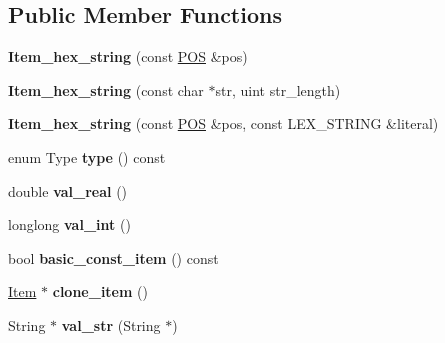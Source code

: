 \subsection*{Public Member Functions}
\begin{DoxyCompactItemize}
\item 
\mbox{\label{classItem__hex__string_af443d112b38e29a35c92ca0e08a1289e}} 
{\bfseries Item\+\_\+hex\+\_\+string} (const \mbox{\hyperlink{structYYLTYPE}{P\+OS}} \&pos)
\item 
\mbox{\label{classItem__hex__string_a8c94371247538d181d7173c548a10da3}} 
{\bfseries Item\+\_\+hex\+\_\+string} (const char $\ast$str, uint str\+\_\+length)
\item 
\mbox{\label{classItem__hex__string_acc4af30a5014f03d0ea41818083e08e0}} 
{\bfseries Item\+\_\+hex\+\_\+string} (const \mbox{\hyperlink{structYYLTYPE}{P\+OS}} \&pos, const L\+E\+X\+\_\+\+S\+T\+R\+I\+NG \&literal)
\item 
\mbox{\label{classItem__hex__string_affc803eaed2b6f7452f55e15b8c1e074}} 
enum Type {\bfseries type} () const
\item 
\mbox{\label{classItem__hex__string_a2f309bad4e77561d3ad378d2c865e6cc}} 
double {\bfseries val\+\_\+real} ()
\item 
\mbox{\label{classItem__hex__string_a104155b4b7e14abc1c1b1f16ee06f7c7}} 
longlong {\bfseries val\+\_\+int} ()
\item 
\mbox{\label{classItem__hex__string_a9ff94fd06ce8d794928e5482400bb2e1}} 
bool {\bfseries basic\+\_\+const\+\_\+item} () const
\item 
\mbox{\label{classItem__hex__string_a05fd2bad1e1163ed7255fe73478fcc80}} 
\mbox{\hyperlink{classItem}{Item}} $\ast$ {\bfseries clone\+\_\+item} ()
\item 
\mbox{\label{classItem__hex__string_ab878bdf0d790d276c303b89a2e4655f0}} 
String $\ast$ {\bfseries val\+\_\+str} (String $\ast$)
\item 

\end{DoxyCompactItemize}
